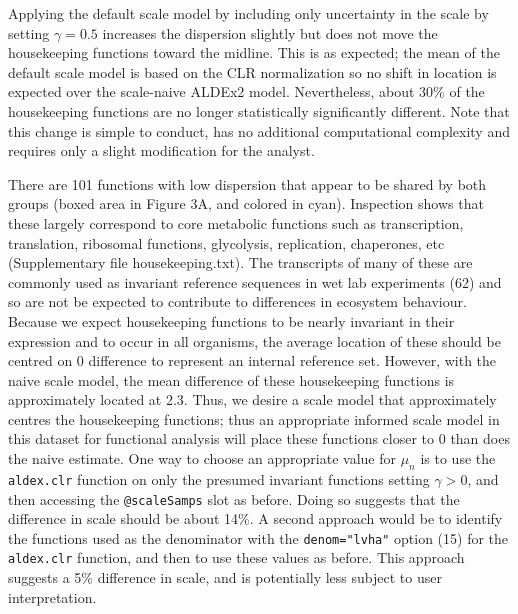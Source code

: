 \documentclass[
]{article}
\begin{document}
Applying the default scale model by including only uncertainty in the
scale by setting \(\gamma=0.5\) increases the dispersion slightly but
does not move the housekeeping functions toward the midline. This is as
expected; the mean of the default scale model is based on the CLR
normalization so no shift in location is expected over the scale-naive
ALDEx2 model. Nevertheless, about 30\% of the housekeeping functions are
no longer statistically significantly different. Note that this change
is simple to conduct, has no additional computational complexity and
requires only a slight modification for the analyst.

There are 101 functions with low dispersion that appear to be shared by
both groups (boxed area in Figure 3A, and colored in cyan). Inspection
shows that these largely correspond to core metabolic functions such as
transcription, translation, ribosomal functions, glycolysis,
replication, chaperones, etc (Supplementary file housekeeping.txt). The
transcripts of many of these are commonly used as invariant reference
sequences in wet lab experiments (62) and so are not be expected to
contribute to differences in ecosystem behaviour. Because we expect
housekeeping functions to be nearly invariant in their expression and to
occur in all organisms, the average location of these should be centred
on 0 difference to represent an internal reference set. However, with
the naive scale model, the mean difference of these housekeeping
functions is approximately located at 2.3. Thus, we desire a scale model
that approximately centres the housekeeping functions; thus an
appropriate informed scale model in this dataset for functional analysis
will place these functions closer to 0 than does the naive estimate. One
way to choose an appropriate value for \(\mu_n\) is to use the
\texttt{aldex.clr} function on only the presumed invariant functions
setting \(\gamma > 0\), and then accessing the \texttt{@scaleSamps} slot
as before. Doing so suggests that the difference in scale should be
about 14\%. A second approach would be to identify the functions used as
the denominator with the \texttt{denom="lvha"} option (15) for the
\texttt{aldex.clr} function, and then to use these values as before.
This approach suggests a 5\% difference in scale, and is potentially
less subject to user interpretation.
\end{document}
